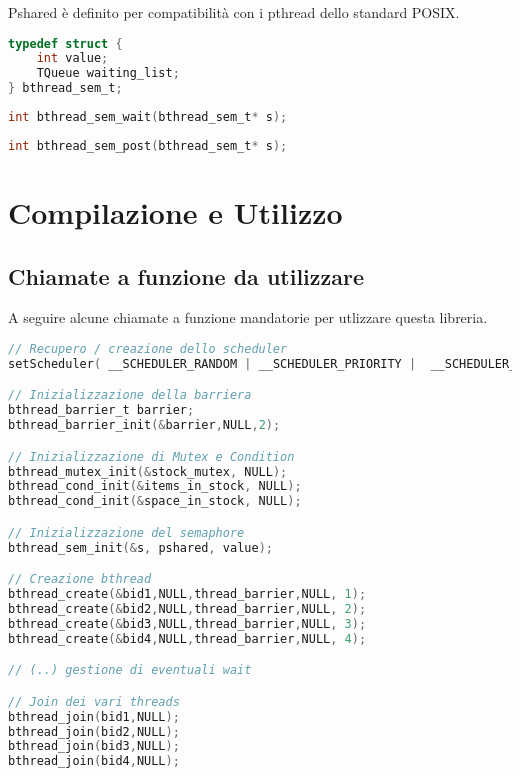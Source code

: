 \documentclass{article}
\begin{document}
Pshared è definito per compatibilità con i pthread dello standard POSIX.
\begin{lstlisting}[language=C]
typedef struct {
    int value;
    TQueue waiting_list;
} bthread_sem_t;
\end{lstlisting}

\begin{lstlisting}[language=C]
int bthread_sem_wait(bthread_sem_t* s);
\end{lstlisting}
\begin{lstlisting}[language=C]
int bthread_sem_post(bthread_sem_t* s);
\end{lstlisting}



\section{Compilazione e Utilizzo}
\vspace{5mm}

\subsection{Chiamate a funzione da utilizzare}
\vspace{2mm}

A seguire alcune chiamate a funzione mandatorie per utlizzare questa libreria.

\begin{lstlisting}[language=C]
// Recupero / creazione dello scheduler
setScheduler( __SCHEDULER_RANDOM | __SCHEDULER_PRIORITY |  __SCHEDULER_ROUNDROBIN);

// Inizializzazione della barriera
bthread_barrier_t barrier;
bthread_barrier_init(&barrier,NULL,2);

// Inizializzazione di Mutex e Condition
bthread_mutex_init(&stock_mutex, NULL);
bthread_cond_init(&items_in_stock, NULL);
bthread_cond_init(&space_in_stock, NULL);

// Inizializzazione del semaphore
bthread_sem_init(&s, pshared, value);

// Creazione bthread
bthread_create(&bid1,NULL,thread_barrier,NULL, 1);
bthread_create(&bid2,NULL,thread_barrier,NULL, 2);
bthread_create(&bid3,NULL,thread_barrier,NULL, 3);
bthread_create(&bid4,NULL,thread_barrier,NULL, 4);

// (..) gestione di eventuali wait

// Join dei vari threads
bthread_join(bid1,NULL);
bthread_join(bid2,NULL);
bthread_join(bid3,NULL);
bthread_join(bid4,NULL);

\end{lstlisting}
\end{document}
